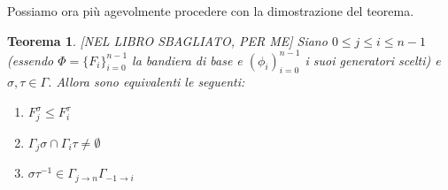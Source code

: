 \documentclass[a4paper,12pt]{report}
\theoremstyle{plain}
\newtheorem{teo}{Teorema}[chapter]
\theoremstyle{definition}
\newcommand\locallabel[1]{\label{\currentprefix_#1}}
\begin{document}
Possiamo ora pi\`u agevolmente procedere con la dimostrazione del teorema.
\begin{teo}
\label{teo:AlgebraicIncidence}
[NEL LIBRO SBAGLIATO, PER ME]
\def\currentprefix{teo:AlgebraicIncidence}
\locallabel{teo:AlgebraicIncidence}
Siano $0\leq j\leq i\leq n-1$ (essendo $\Phi=\{F_i\}_{i=0}^{n-1}$ la bandiera di base e $(\phi_i)_{i=0}^{n-1}$ i suoi generatori scelti) 
e $\sigma,\tau\in\Gamma$. Allora
sono equivalenti le seguenti:
\begin{enumerate}
\item\locallabel{1}$F_j^\sigma\leq F_i^\tau$
\item\locallabel{2}$\Gamma_j\sigma\cap\Gamma_i\tau\neq\emptyset$
\item\locallabel{3}$\sigma\tau^{-1}\in\Gamma_{j\rightarrow n}\Gamma_{-1\rightarrow i}$
\end{enumerate}
\end{teo}
\end{document}
